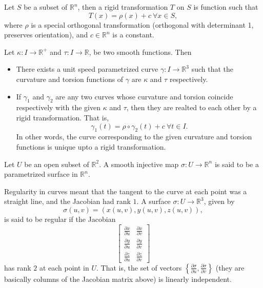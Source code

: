 \begin{definition}
    Let $S$ be a subset of $\mathbb{R}^{n}$, then a rigid transformation $T$ on $S$ is function such that $$T(x)=\rho(x)+c~\forall x\in S,$$ where $\rho$ is a special orthogonal transformation (orthogonal with determinant 1, preserves orientation), and $c\in \mathbb{R}^{n}$ is a constant.
\end{definition}
\vspace{0.4cm}
\begin{theorem}
    Let $\kappa:I\to\mathbb{R}^{+}$ and $\tau:I\to \mathbb{R}$, be two smooth functions. Then
    \begin{itemize}
        \item There exists a unit speed parametrized curve $\gamma:I\to\mathbb{R}^{3}$ such that the curvature and torsion functions of $\gamma$ are $\kappa$ and $\tau$ respectively.
        \item If $\gamma_{1}$ and $\gamma_{2}$ are any two curves whose curvature and torsion coincide respectively with the given $\kappa$ and $\tau$, then they are realted to each other by a rigid transformation. That is, $$\gamma_{1}(t)=\rho\circ\gamma_{2}(t)+c~\forall t\in I.$$
            In other words, the curve corresponding to the given curvature and torsion functions is unique upto a rigid transformation.
    \end{itemize}
\end{theorem}
\vspace{0.4cm}
\begin{definition}
    Let $U$ be an open subset of $\mathbb{R}^{2}$. A smooth injective map $\sigma:U\to \mathbb{R}^{n}$ is said to be a parametrized surface in $\mathbb{R}^{n}$.
\end{definition}
\vspace{0.4cm}
\begin{note}
    Regularity in curves meant that the tangent to the curve at each point was a straight line, and the Jacobian had rank $1$. A surface $\sigma:U\to\mathbb{R}^{3}$, given by $$\sigma(u,v)=(x(u,v),y(u,v),z(u,v)),$$
    is said to be regular if the Jacobian
    $$\begin{bmatrix}
        \frac{\partial x}{\partial u}&\frac{\partial x}{\partial v}\\
        \frac{\partial y}{\partial u}&\frac{\partial y}{\partial v}\\
        \frac{\partial z}{\partial u}&\frac{\partial z}{\partial v}
    \end{bmatrix}$$ has rank $2$ at each point in $U$. That is, the set of vectors $\left\{\frac{\partial\sigma}{\partial u},\frac{\partial\sigma}{\partial v}\right\}$ (they are basically columns of the Jacobian matrix above) is linearly independent.
\end{note}
